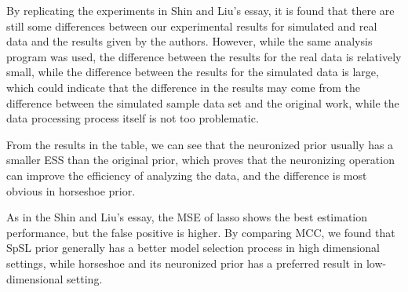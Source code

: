By replicating the experiments in Shin and Liu's essay\cite{shin2021neuronized}, it is found that there are still some differences between our experimental results for simulated and real data and the results given by the authors. However, while the same analysis program was used, the difference between the results for the real data is relatively small, while the difference between the results for the simulated data is large, which could indicate that the difference in the results may come from the difference between the simulated sample data set and the original work, while the data processing process itself is not too problematic.

From the results in the table, we can see that the neuronized prior usually has a smaller ESS than the original prior, which proves that the neuronizing operation can improve the efficiency of analyzing the data, and the difference is most obvious in horseshoe prior.

As in the Shin and Liu's essay, the MSE of lasso shows the best estimation performance, but the false positive is higher. By comparing MCC, we found that SpSL prior generally has a better model selection process in high dimensional settings, while horseshoe and its neuronized prior has a preferred result in low-dimensional setting.